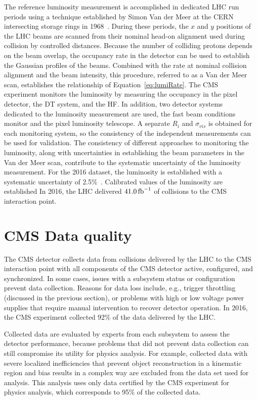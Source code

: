 The reference luminosity measurement is accomplished in dedicated LHC run periods using 
a technique established by Simon Van der Meer at the CERN intersecting storage
rings in 1968~\cite{vanderMeer:296752}. During these periods, the $x$ and $y$ positions of the LHC beams are
scanned from their nominal head-on alignment used during collision by controlled distances.
Because the number of colliding protons depends on the beam overlap,
the occupancy rate in the detector can be used to establish the Gaussian profiles of 
the beams. Combined with the rate at nominal collision alignment and the beam intensity,
this procedure, referred to as a Van der Meer scan, establishes the relationship of 
Equation~\ref{eq:lumiRate}.
The CMS experiment monitors the luminosity by measuring the occupancy
in the pixel detector, the DT system, and the HF. In addition, two detector
systems dedicated to the luminosity measurement are used, the fast beam conditions monitor 
and the pixel luminosity telescope. A separate $R_i$ and $\sigma_{vis}$ is obtained for
each monitoring system, so the consistency of the independent measurements can be used
for validation. 
The consistency of different approaches to monitoring the luminosity,
along with uncertainties in establishing the beam parameters in the Van der Meer scan,
contribute to the systematic uncertainty of the luminosity measurement. For the 2016
dataset, the luminosity is established with a systematic uncertainty of 2.5\%~\cite{CMS-PAS-LUM-17-001}.
Calibrated values of the luminosity are established
In 2016, the LHC delivered $41.0\mbox{\ensuremath{\,\text{fb}^\text{$-$1}}}$ of {\pp} collisions to the CMS interaction point.

\section{CMS Data quality}

The CMS detector collects data from collisions delivered by the LHC to the CMS interaction point
with all components of the CMS detector active, configured, and synchronized. In some cases,
issues with a subsystem status or configuration prevent data collection. Reasons for data loss include, e.g., 
trigger throttling (discussed in the previous section), or problems with
high or low voltage power supplies that require manual intervention to recover detector operation.
In 2016, the CMS experiment collected 92\% of the data delivered by the LHC. 

Collected data
are evaluated by experts from each subsystem to assess the detector performance, because 
problems that did not prevent data collection can still compromise its utility for physics analysis.
For example, collected data with severe localized inefficiencies that prevent 
object reconstruction in a kinematic region and bias results in a complex way are excluded from 
the data set used for analysis.
This analysis uses only data certified by the CMS
experiment for physics analysis, which corresponds to 95\% of the collected data.

